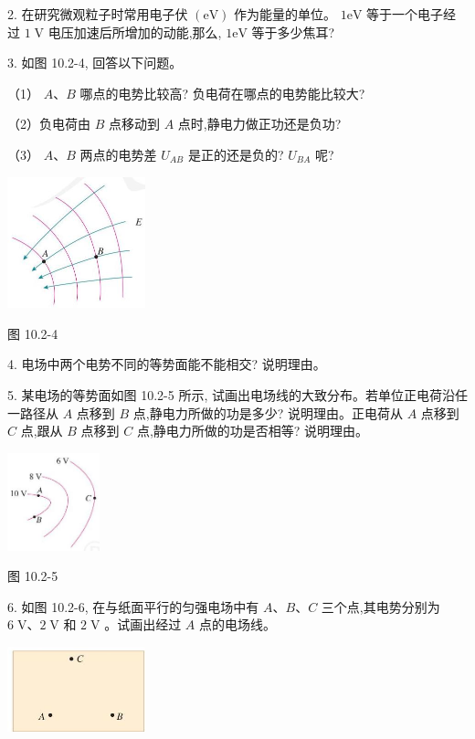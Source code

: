 \documentclass[10pt]{article}
\begin{document}
2. 在研究微观粒子时常用电子伏 \(\left( \mathrm{{eV}}\right)\) 作为能量的单位。 \(1\mathrm{{eV}}\) 等于一个电子经过 \(1\mathrm{\;V}\) 电压加速后所增加的动能,那么, \(1\mathrm{{eV}}\) 等于多少焦耳?

3. 如图 10.2-4, 回答以下问题。

（1） \(A\text{、}B\) 哪点的电势比较高? 负电荷在哪点的电势能比较大?

（2）负电荷由 \(B\) 点移动到 \(A\) 点时,静电力做正功还是负功?

（3） \(A\text{、}B\) 两点的电势差 \({U}_{AB}\) 是正的还是负的? \({U}_{BA}\) 呢?

\begin{center}
\includegraphics[max width=0.3\textwidth]{images/01911d5f-8e38-70c0-b5b8-2b399bd115b6_39_945961.jpg}
\end{center}

图 10.2-4

4. 电场中两个电势不同的等势面能不能相交? 说明理由。

5. 某电场的等势面如图 10.2-5 所示, 试画出电场线的大致分布。若单位正电荷沿任一路径从 \(A\) 点移到 \(B\) 点,静电力所做的功是多少? 说明理由。正电荷从 \(A\) 点移到 \(C\) 点,跟从 \(B\) 点移到 \(C\) 点,静电力所做的功是否相等? 说明理由。

\begin{center}
\includegraphics[max width=0.2\textwidth]{images/01911d5f-8e38-70c0-b5b8-2b399bd115b6_39_489155.jpg}
\end{center}

图 10.2-5

6. 如图 10.2-6, 在与纸面平行的匀强电场中有 \(A\text{、}B\text{、}C\) 三个点,其电势分别为 \(6\mathrm{\;V}\text{、}2\mathrm{\;V}\) 和 \(2\mathrm{\;V}\) 。试画出经过 \(A\) 点的电场线。

\begin{center}
\includegraphics[max width=0.3\textwidth]{images/01911d5f-8e38-70c0-b5b8-2b399bd115b6_39_725760.jpg}
\end{center}
\end{document}
